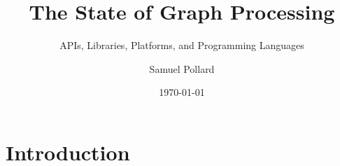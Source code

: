 \documentclass[11pt]{scrartcl}
\begin{document}
\title{The State of Graph Processing}
\subtitle{APIs, Libraries, Platforms, and Programming Languages}
\author{Samuel Pollard}
\date{\today}
\maketitle

\section{Introduction}
\end{document}
